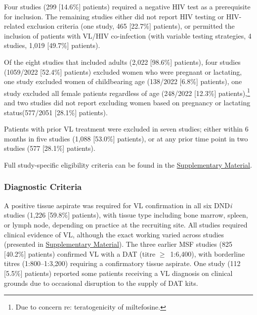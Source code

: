 Four studies (299 [14.6\%] patients) required a negative HIV test as a prerequisite for inclusion\cite{wasunna2016,musa2010,mbui2019,khalil2014}. The remaining studies either did not report HIV testing or HIV-related exclusion criteria (one study, 465 [22.7\%] patients)\cite{veeken2000}, or permitted the inclusion of patients with VL/HIV co-infection (with variable testing strategies, 4 studies, 1,019 [49.7\%] patients)\cite{hailu2010,musa2012,ritmeijer2001,ritmeijer2006}.

Of the eight studies that included adults (2,022 [98.6\%] patients), four studies (1059/2022 [52.4\%] patients) excluded women who were pregnant or lactating\cite{musa2010,musa2012,hailu2010,khalil2014}, one study excluded women of childbearing age (138/2022 [6.8\%] patients)\cite{wasunna2016}, one study excluded all female patients regardless of age (248/2022 [12.3\%] patients)\cite{ritmeijer2006},\footnote{Due to concern re: teratogenicity of miltefosine.} and two studies did not report excluding women based on pregnancy or lactating status(577/2051 [28.1\%] patients)\cite{ritmeijer2001,ritmeijer2006}.

Patients with prior VL treatment were excluded in seven studies; either within 6 months in five studies (1,088 [53.0\%] patients)\cite{hailu2010,khalil2014,mbui2019,musa2010,musa2012}, or at any prior time point in two studies (577 [28.1\%] patients)\cite{veeken2000,ritmeijer2001}.

Full study-specific eligibility criteria can be found in the \href{https://github.com/jpwil/dphil}{Supplementary Material}.

\subsubsection{Diagnostic Criteria}

A positive tissue aspirate was required for VL confirmation in all six DND\textit{i} studies (1,226 [59.8\%] patients), with tissue type including bone marrow, spleen, or lymph node, depending on practice at the recruiting site. All studies required clinical evidence of VL, although the exact working varied across studies (presented in \href{https://github.com/jpwil/dphil}{Supplementary Material}). The three earlier MSF studies (825 [40.2\%] patients)\cite{veeken2000,ritmeijer2006,ritmeijer2001} confirmed VL with a DAT (titre $\geq$~1:6,400), with borderline titres (1:800--1:3,200) requiring a confirmatory tissue aspirate. One study (112 [5.5\%] patients) reported some patients receiving a VL diagnosis on clinical grounds due to occasional disruption to the supply of DAT kits\cite{ritmeijer2001}.

